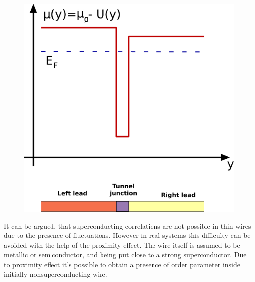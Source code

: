 \begin{figure}
	\centering
	\includegraphics[width=0.7\linewidth]{images/chem_potential}
	\caption{}
	\label{fig:chempotential}
\end{figure}


It can be argued, that superconducting correlations are not possible in thin wires due to the presence of fluctuations. However in real systems this difficulty can be avoided with the help of the proximity effect. The wire itself is assumed to be metallic or semiconductor, and being put close to a strong superconductor. Due to proximity effect it's possible to obtain a presence of order parameter inside initially nonsuperconducting wire.